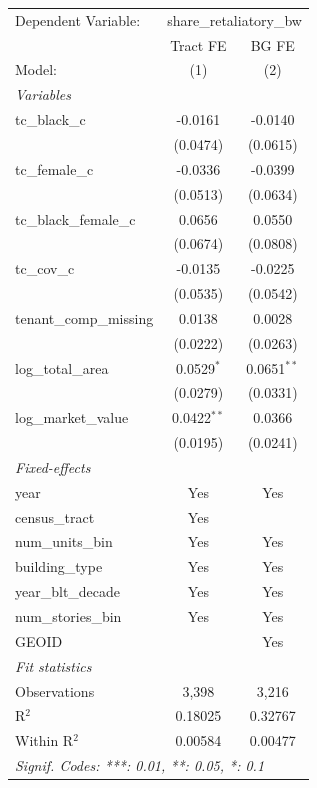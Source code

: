 \par\endgroup
\begingroup
\centering
\begin{tabular}{lcc}
   \tabularnewline \midrule \midrule
   Dependent Variable: & \multicolumn{2}{c}{share\_retaliatory\_bw}\\
                           & Tract FE      & BG FE \\   
   Model:                  & (1)           & (2)\\  
   \midrule
   \emph{Variables}\\
   tc\_black\_c            & -0.0161       & -0.0140\\   
                           & (0.0474)      & (0.0615)\\   
   tc\_female\_c           & -0.0336       & -0.0399\\   
                           & (0.0513)      & (0.0634)\\   
   tc\_black\_female\_c    & 0.0656        & 0.0550\\   
                           & (0.0674)      & (0.0808)\\   
   tc\_cov\_c              & -0.0135       & -0.0225\\   
                           & (0.0535)      & (0.0542)\\   
   tenant\_comp\_missing   & 0.0138        & 0.0028\\   
                           & (0.0222)      & (0.0263)\\   
   log\_total\_area        & 0.0529$^{*}$  & 0.0651$^{**}$\\   
                           & (0.0279)      & (0.0331)\\   
   log\_market\_value      & 0.0422$^{**}$ & 0.0366\\   
                           & (0.0195)      & (0.0241)\\   
   \midrule
   \emph{Fixed-effects}\\
   year                    & Yes           & Yes\\  
   census\_tract           & Yes           & \\  
   num\_units\_bin         & Yes           & Yes\\  
   building\_type          & Yes           & Yes\\  
   year\_blt\_decade       & Yes           & Yes\\  
   num\_stories\_bin       & Yes           & Yes\\  
   GEOID                   &               & Yes\\  
   \midrule
   \emph{Fit statistics}\\
   Observations            & 3,398         & 3,216\\  
   R$^2$                   & 0.18025       & 0.32767\\  
   Within R$^2$            & 0.00584       & 0.00477\\  
   \midrule \midrule
   \multicolumn{3}{l}{\emph{Signif. Codes: ***: 0.01, **: 0.05, *: 0.1}}\\
\end{tabular}
